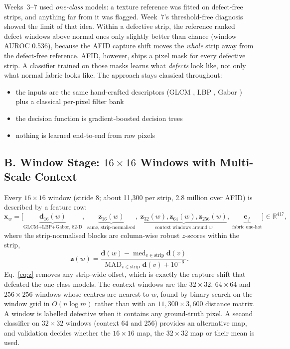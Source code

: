 \documentclass[11pt,a4paper]{article}
\begin{document}
Weeks~3--7 used \emph{one-class} models: a texture reference was fitted on defect-free strips, and anything far from it was flagged. Week~7's threshold-free diagnosis showed the limit of that idea. Within a defective strip, the reference ranked defect windows above normal ones only slightly better than chance (window AUROC 0.536), because the AFID capture shift moves the \emph{whole} strip away from the defect-free reference. AFID, however, ships a pixel mask for every defective strip. A classifier trained on those masks learns what \emph{defects} look like, not only what normal fabric looks like. The approach stays classical throughout:
\begin{itemize}
  \item the inputs are the same hand-crafted descriptors (GLCM \cite{haralick1973}, LBP \cite{ojala2002}, Gabor \cite{jain1991}) plus a classical per-pixel filter bank
  \item the decision function is gradient-boosted decision trees \cite{friedman2001,ke2017}
  \item nothing is learned end-to-end from raw pixels
\end{itemize}

\subsection*{B. Window Stage: $16\times16$ Windows with Multi-Scale Context}

Every $16\times16$ window (stride 8; about 11{,}300 per strip, 2.8 million over AFID) is described by a feature row:
\begin{equation}
\mathbf{x}_w=\Big[\underbrace{\mathbf{d}_{16}(w)}_{\text{GLCM+LBP+Gabor, 82-D}},\;
\underbrace{\mathbf{z}_{16}(w)}_{\text{same, strip-normalised}},\;
\underbrace{\mathbf{z}_{32}(w),\mathbf{z}_{64}(w),\mathbf{z}_{256}(w)}_{\text{context windows around }w},\;
\underbrace{\mathbf{e}_f}_{\text{fabric one-hot}}\Big]\in\mathbb{R}^{417},
\label{eq:row}
\end{equation}
where the strip-normalised blocks are column-wise robust $z$-scores within the strip,
\begin{equation}
\mathbf{z}(w)=\frac{\mathbf{d}(w)-\operatorname{med}_{v\in\text{strip}}\mathbf{d}(v)}{\operatorname{MAD}_{v\in\text{strip}}\mathbf{d}(v)+10^{-6}}.
\label{eq:z}
\end{equation}
Eq.~\eqref{eq:z} removes any strip-wide offset, which is exactly the capture shift that defeated the one-class models. The context windows are the $32\times32$, $64\times64$ and $256\times256$ windows whose centres are nearest to $w$, found by binary search on the window grid in $O(n\log m)$ rather than with an $11{,}300\times3{,}600$ distance matrix. A window is labelled defective when it contains any ground-truth pixel. A second classifier on $32\times32$ windows (context 64 and 256) provides an alternative map, and validation decides whether the $16\times16$ map, the $32\times32$ map or their mean is used.
\end{document}
